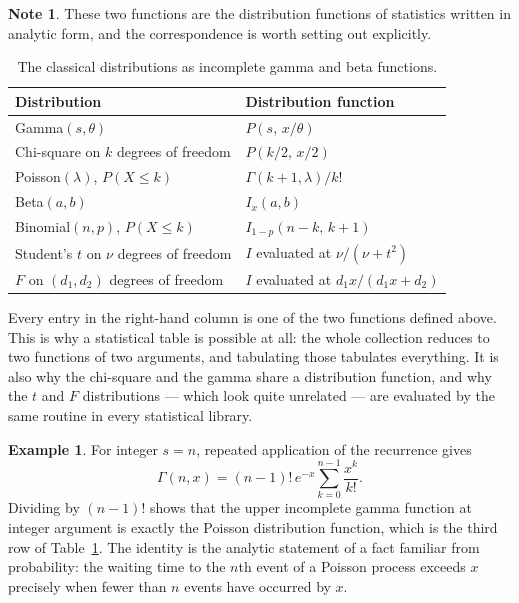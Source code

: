 \documentclass[12pt,a4paper]{report}
\theoremstyle{definition}
\newtheorem{exa}[thm]{Example}
\newtheorem{note}[thm]{Note}
\theoremstyle{plain}
\begin{document}
\begin{note}
These two functions are the distribution functions of statistics written in
analytic form, and the correspondence is worth setting out explicitly.

\begin{table}[H]
\centering
\small
\begin{tabular}{|l|l|}
\hline
\textbf{Distribution} & \textbf{Distribution function}\\
\hline
Gamma$(s,\theta)$ & $P\left(s,\,x/\theta\right)$\\
Chi-square on $k$ degrees of freedom & $P\left(k/2,\,x/2\right)$\\
Poisson$(\lambda)$, $P(X\leq k)$ & $\Gamma(k+1,\lambda)/k!$\\
Beta$(a,b)$ & $I_x(a,b)$\\
Binomial$(n,p)$, $P(X\leq k)$ & $I_{1-p}(n-k,\,k+1)$\\
Student's $t$ on $\nu$ degrees of freedom & $I$ evaluated at $\nu/(\nu+t^{2})$\\
$F$ on $(d_1,d_2)$ degrees of freedom & $I$ evaluated at $d_1x/(d_1x+d_2)$\\
\hline
\end{tabular}
\caption{The classical distributions as incomplete gamma and beta functions.}
\label{tab:incompl}
\end{table}

Every entry in the right-hand column is one of the two functions defined above.
This is why a statistical table is possible at all: the whole collection reduces
to two functions of two arguments, and tabulating those tabulates everything.
It is also why the chi-square and the gamma share a distribution function, and
why the $t$ and $F$ distributions --- which look quite unrelated --- are
evaluated by the same routine in every statistical library.
\end{note}

\begin{exa}
For integer $s=n$, repeated application of the recurrence gives
$$\Gamma(n,x) = (n-1)!\,e^{-x}\sum^{n-1}_{k=0}\frac{x^{k}}{k!} .$$
Dividing by $(n-1)!$ shows that the upper incomplete gamma function at integer
argument is exactly the Poisson distribution function, which is the third row of
Table~\ref{tab:incompl}. The identity is the analytic statement of a fact
familiar from probability: the waiting time to the $n$th event of a Poisson
process exceeds $x$ precisely when fewer than $n$ events have occurred by $x$.
\end{exa}
\end{document}
